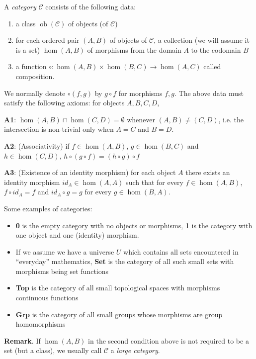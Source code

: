A \emph{category} $\mathcal{C}$ consists of the following data:
\begin{enumerate}
\item a class $\operatorname{ob}(\mathcal{C})$ of objects (of $\mathcal{C}$)
\item for each ordered pair $(A,B)$ of objects of $\mathcal{C}$, a collection (we will assume it is
 a set) $\hom(A,B)$ of morphisms from the domain $A$ to the codomain $B$
\item a function $\circ:\hom(A,B)\times\hom(B,C)\to\hom(A,C)$ called composition.
\end{enumerate}

We normally denote $\circ(f,g)$ by $g \circ f$ for morphisms $f,g$. The above data must satisfy the following axioms: for objects $A,B,C,D$,

\textbf{A1}: $\hom(A,B) \cap \hom(C,D)=\emptyset$ whenever $(A,B)\neq (C,D)$, i.e. the intersection is non-trivial only when $A=C$ and $B=D$.

\textbf{A2}: (Associativity) if $f \in \hom(A,B)$, $g\in\hom(B,C)$ and $h\in\hom(C,D)$, $h\circ (g\circ f)=(h\circ g)\circ f$

\textbf{A3}: (Existence of an identity morphism) for each object $A$ there exists an identity morphism $ {}id_{A}\in\hom(A,A)$ such that for every $f\in\hom(A,B)$, $f\circ id_{A}=f$ and $ {}id_{A}\circ g=g$ for every $g \in \hom(B,A)$.

Some examples of categories:
\begin{itemize}
\item \textbf{0} is the empty category with no objects or morphisms, \textbf{1} is the category with one object and one (identity) morphism.
\item If we assume we have a universe $U$ which contains all sets encountered in ``everyday'' mathematics,
\textbf{Set} is the category of all such small sets with morphisms being set functions
\item \textbf{Top} is the category of all small topological spaces with morphisms continuous functions 
\item \textbf{Grp} is the category of all small groups whose morphisms are group homomorphisms 
\end{itemize}

\textbf{Remark}.  If $\hom(A,B)$ in the second condition above is not required to be a set (but a class), we usually call $\mathcal{C}$ a \emph{large category}.